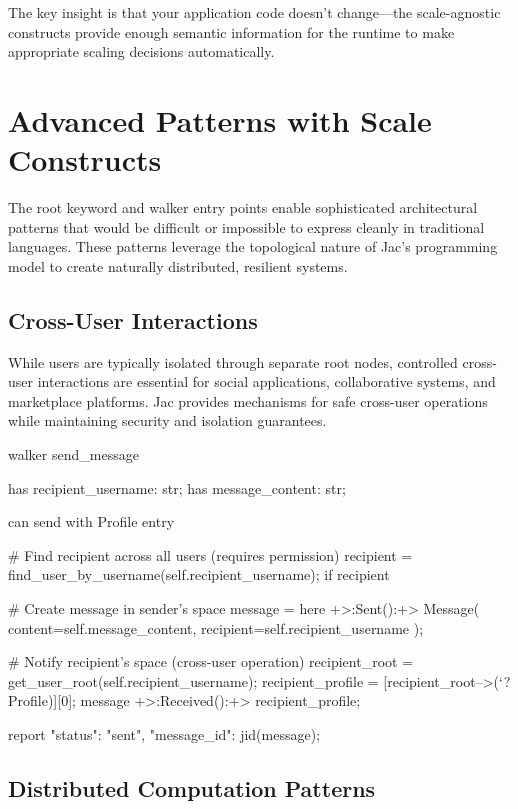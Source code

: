The key insight is that your application code doesn't change—the scale-agnostic constructs provide enough semantic information for the runtime to make appropriate scaling decisions automatically.

\section{Advanced Patterns with Scale Constructs}

The root keyword and walker entry points enable sophisticated architectural patterns that would be difficult or impossible to express cleanly in traditional languages. These patterns leverage the topological nature of Jac's programming model to create naturally distributed, resilient systems.

\subsection{Cross-User Interactions}

While users are typically isolated through separate root nodes, controlled cross-user interactions are essential for social applications, collaborative systems, and marketplace platforms. Jac provides mechanisms for safe cross-user operations while maintaining security and isolation guarantees.

\begin{jacblock}
walker send_message {
    has recipient_username: str;
    has message_content: str;

    can send with Profile entry {
        # Find recipient across all users (requires permission)
        recipient = find_user_by_username(self.recipient_username);
        if recipient {
            # Create message in sender's space
            message = here +>:Sent():+> Message(
                content=self.message_content,
                recipient=self.recipient_username
            );

            # Notify recipient's space (cross-user operation)
            recipient_root = get_user_root(self.recipient_username);
            recipient_profile = [recipient_root-->(`?Profile)][0];
            message +>:Received():+> recipient_profile;

            report {"status": "sent", "message_id": jid(message)};
        }
    }
}
\end{jacblock}

\subsection{Distributed Computation Patterns}


